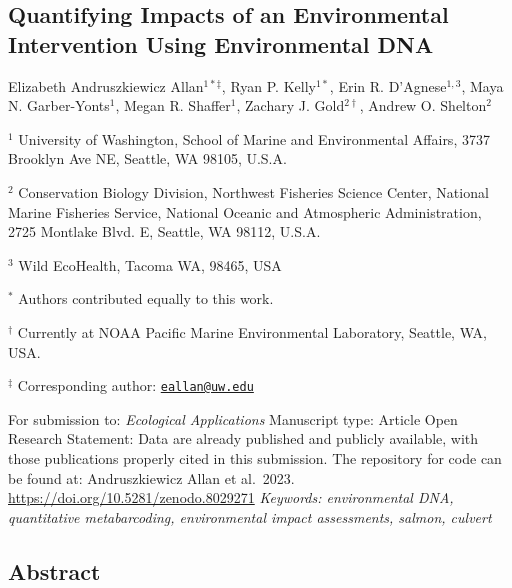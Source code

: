 \documentclass[
]{article}
\author{}
\date{\vspace{-2.5em}}
\begin{document}
\hypertarget{quantifying-impacts-of-an-environmental-intervention-using-environmental-dna}{%
\subsection{Quantifying Impacts of an Environmental Intervention Using
Environmental
DNA}\label{quantifying-impacts-of-an-environmental-intervention-using-environmental-dna}}

Elizabeth Andruszkiewicz Allan\(^{1*\ddagger}\), Ryan P. Kelly\(^{1*}\),
Erin R. D'Agnese\(^{1,3}\), Maya N. Garber-Yonts\(^{1}\), Megan R.
Shaffer\(^{1}\), Zachary J. Gold\(^{2\dagger}\), Andrew O.
Shelton\(^{2}\)

\(^{1}\) University of Washington, School of Marine and Environmental
Affairs, 3737 Brooklyn Ave NE, Seattle, WA 98105, U.S.A.

\(^2\) Conservation Biology Division, Northwest Fisheries Science
Center, National Marine Fisheries Service, National Oceanic and
Atmospheric Administration, 2725 Montlake Blvd. E, Seattle, WA 98112,
U.S.A.

\(^3\) Wild EcoHealth, Tacoma WA, 98465, USA

\vspace{1em}

\(^{*}\) Authors contributed equally to this work.

\(^{\dagger}\) Currently at NOAA Pacific Marine Environmental
Laboratory, Seattle, WA, USA.

\(^{\ddagger}\) Corresponding author:
\href{mailto:eallan@uw.edu}{\nolinkurl{eallan@uw.edu}} \vspace{1em}

For submission to: \textit{Ecological Applications} \newline Manuscript
type: Article \newline Open Research Statement: Data are already
published and publicly available, with those publications properly cited
in this submission. The repository for code can be found at: Andruszkiewicz Allan et al.~2023.
\url{https://doi.org/10.5281/zenodo.8029271}
\newline \textit{Keywords: environmental DNA, quantitative metabarcoding, environmental impact assessments, salmon, culvert}

\newpage

\hypertarget{abstract}{%
\subsection{Abstract}\label{abstract}}
\end{document}
